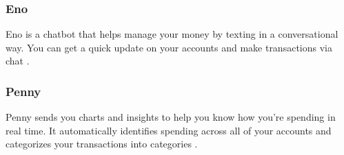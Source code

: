 \subsubsection{Eno}
Eno is a chatbot that helps manage your money by texting in a conversational way. You can get a quick update on your accounts and make transactions via chat \cite{eno}.

\subsubsection{Penny}
Penny sends you charts and insights to help you know how you're spending in real time. It automatically identifies spending across all of your accounts and categorizes your transactions into categories \cite{penny}.